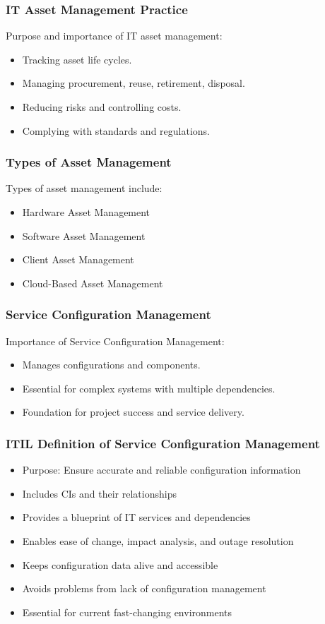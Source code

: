 \documentclass[aspectratio=169, table]{beamer}
\begin{document}
\begin{frame}
\frametitle{IT Asset Management Practice}

Purpose and importance of IT asset management:
\begin{itemize}
	\item Tracking asset life cycles.
	\item Managing procurement, reuse, retirement, disposal.
	\item Reducing risks and controlling costs.
	\item Complying with standards and regulations.
\end{itemize}

\end{frame}

\begin{frame}
\frametitle{Types of Asset Management}

Types of asset management include:
\begin{itemize}
	\item Hardware Asset Management
	\item Software Asset Management
	\item Client Asset Management
	\item Cloud-Based Asset Management
\end{itemize}

\end{frame}

\begin{frame}
\frametitle{Service Configuration Management}

Importance of Service Configuration Management:
\begin{itemize}
	\item Manages configurations and components.
	\item Essential for complex systems with multiple dependencies.
	\item Foundation for project success and service delivery.
\end{itemize}

\end{frame}

\begin{frame}
	\frametitle{ITIL Definition of Service Configuration Management}
	\begin{itemize}
		\item Purpose: Ensure accurate and reliable configuration information
		\item Includes CIs and their relationships
		\item Provides a blueprint of IT services and dependencies
		\item Enables ease of change, impact analysis, and outage resolution
		\item Keeps configuration data alive and accessible
		\item Avoids problems from lack of configuration management
		\item Essential for current fast-changing environments
	\end{itemize}
\end{frame}
\end{document}
